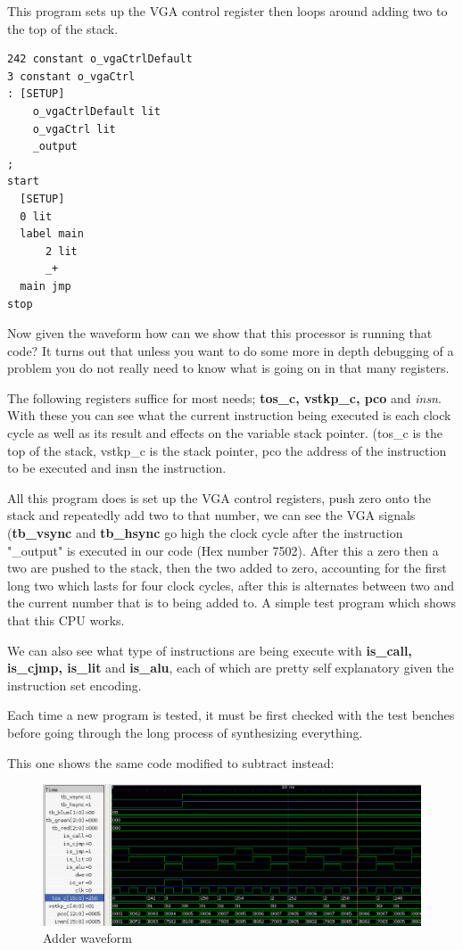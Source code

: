 \documentclass	[a4paper, 10pt]	{article}
\begin{document}
      This program sets up the VGA control register then loops around adding two to the top
      of the stack.

\begin{verbatim}
242 constant o_vgaCtrlDefault 
3 constant o_vgaCtrl
: [SETUP]
    o_vgaCtrlDefault lit
    o_vgaCtrl lit 
    _output
;
start
  [SETUP]
  0 lit
  label main
      2 lit
      _+
  main jmp
stop 
\end{verbatim}

    Now given the waveform how can we show that this processor is running that code? It turns
    out that unless you want to do some more in depth debugging of a problem you do not really
    need to know what is going on in that many registers.

    The following registers suffice for most needs; \textbf{tos\_c, vstkp\_c, pco} and \emph{insn}.
    With these you can see what the current instruction being executed is each clock cycle as
    well as its result and effects on the variable stack pointer. (tos\_c is the top of the stack,
    vstkp\_c is the stack pointer, pco the address of the instruction to be executed and insn the
    instruction. 

    All this program does is set up the VGA control registers, push zero onto the stack and
    repeatedly add two to that number, we can see the VGA signals (\textbf{tb\_vsync} and \textbf{tb\_hsync}
    go high the clock cycle after the instruction "\_output" is executed in our code (Hex number
    7502). After this a zero then a two are pushed to the stack, then the two added to zero,
    accounting for the first long two which lasts for four clock cycles, after this is alternates
    between two and the current number that is to being added to. A simple test program which
    shows that this CPU works.

    We can also see what type of instructions are being execute with \textbf{is\_call, is\_cjmp,
    is\_lit} and \textbf{is\_alu}, each of which are pretty self explanatory given the instruction
    set encoding.

    Each time a new program is tested, it must be first checked with the test benches before going
    through the long process of synthesizing everything.

    This one shows the same code modified to subtract instead:

      \begin{figure}[ht]
        \hspace*{-3.5cm}
        \centering
        \includegraphics[width=1.6\textwidth]{pic/wav_sub.png}
        \caption{Adder waveform}
        \label{fig:Adder waveform}
      \end{figure}
      \FloatBarrier
\end{document}
